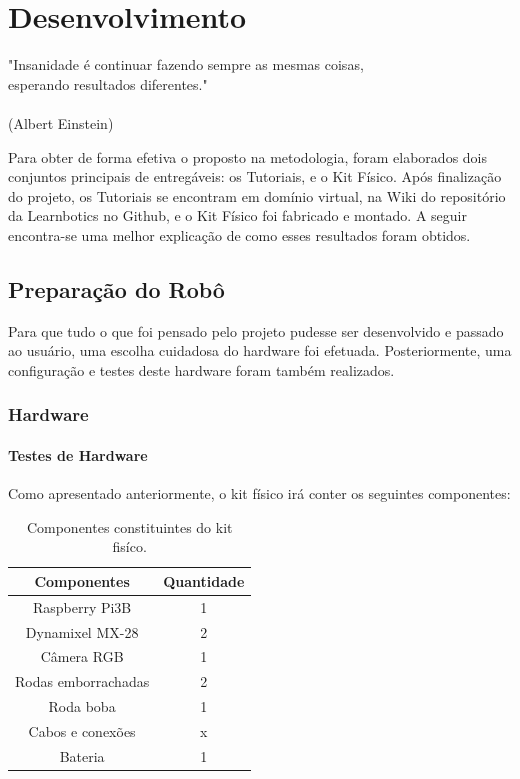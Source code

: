 \chapter{Desenvolvimento}
\label{chap:desen_test}
\begin{flushright}
	"Insanidade é continuar fazendo sempre as mesmas coisas, \\ 
	esperando resultados diferentes." \\
	\ \\
	(Albert Einstein)
\end{flushright}

Para obter de forma efetiva o proposto na metodologia, foram elaborados dois conjuntos principais de entregáveis: os Tutoriais, e o Kit Físico. Após finalização do projeto, os Tutoriais se encontram em domínio virtual, na Wiki do repositório da Learnbotics no Github, e o Kit Físico foi fabricado e montado. A seguir encontra-se uma melhor explicação de como esses resultados foram obtidos.

\section{Preparação do Robô}
Para que tudo o que foi pensado pelo projeto pudesse ser desenvolvido e passado ao usuário, uma escolha cuidadosa do hardware foi efetuada. Posteriormente, uma configuração e testes deste hardware foram também realizados.

\subsection{Hardware}

\subsubsection{Testes de Hardware}
Como apresentado anteriormente, o kit físico irá conter os seguintes componentes:
\begin{table}
	\centering
	\begin{small}
		\caption{Componentes constituintes do kit fisíco.} \label{Tabela1}
		\begin{tabular}{cc}
			\hline
			Componentes              & Quantidade\\
			\hline
			Raspberry Pi3B              & 1 \\
			Dynamixel MX-28			    & 2 \\
			Câmera RGB		            & 1 \\
			Rodas emborrachadas		    & 2 \\
			Roda boba		            & 1 \\
			Cabos e conexões            & x \\
			Bateria 			        & 1 \\
			\hline
		\end{tabular}
	\end{small}
\end{table}

